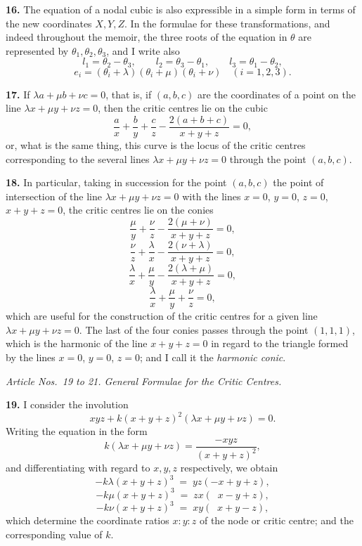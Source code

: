 \documentclass[11pt,a4paper]{article}
\begin{document}
\medskip

\textbf{16.} The equation of a nodal cubic is also expressible in a simple form in terms of the new coordinates $X, Y, Z$. In the formulae for these transformations, and indeed throughout the memoir, the three roots of the equation in $\theta$ are represented by $\theta_1, \theta_2, \theta_3$, and I write also
\[
l_1 = \theta_2 - \theta_3,\qquad l_2 = \theta_3 - \theta_1,\qquad l_3 = \theta_1 - \theta_2,
\]
\[
e_i = (\theta_i + \lambda)(\theta_i + \mu)(\theta_i + \nu)\quad (i = 1, 2, 3).
\]

\medskip

\textbf{17.} If $\lambda a + \mu b + \nu c = 0$, that is, if $(a, b, c)$ are the coordinates of a point on the line $\lambda x + \mu y + \nu z = 0$, then the critic centres lie on the cubic
\[
\frac{a}{x} + \frac{b}{y} + \frac{c}{z} - \frac{2(a + b + c)}{x + y + z} = 0,
\]
or, what is the same thing, this curve is the locus of the critic centres corresponding to the several lines $\lambda x + \mu y + \nu z = 0$ through the point $(a, b, c)$.

\medskip

\textbf{18.} In particular, taking in succession for the point $(a, b, c)$ the point of intersection of the line $\lambda x + \mu y + \nu z = 0$ with the lines $x = 0$, $y = 0$, $z = 0$, $x + y + z = 0$, the critic centres lie on the conies
\[
\frac{\mu}{y} + \frac{\nu}{z} - \frac{2(\mu + \nu)}{x + y + z} = 0,
\]
\[
\frac{\nu}{z} + \frac{\lambda}{x} - \frac{2(\nu + \lambda)}{x + y + z} = 0,
\]
\[
\frac{\lambda}{x} + \frac{\mu}{y} - \frac{2(\lambda + \mu)}{x + y + z} = 0,
\]
\[
\frac{\lambda}{x} + \frac{\mu}{y} + \frac{\nu}{z} = 0,
\]
which are useful for the construction of the critic centres for a given line $\lambda x + \mu y + \nu z = 0$. The last of the four conies passes through the point $(1, 1, 1)$, which is the harmonic of the line $x + y + z = 0$ in regard to the triangle formed by the lines $x = 0$, $y = 0$, $z = 0$; and I call it the \emph{harmonic conic}.

\begin{center}
\textit{Article Nos.~19 to 21. General Formulae for the Critic Centres.}
\end{center}

\textbf{19.} I consider the involution
\[
xyz + k(x + y + z)^2(\lambda x + \mu y + \nu z) = 0.
\]
Writing the equation in the form
\[
k(\lambda x + \mu y + \nu z) = \frac{-xyz}{(x + y + z)^2},
\]
and differentiating with regard to $x, y, z$ respectively, we obtain
\[
-k\lambda(x + y + z)^3 \;=\; yz(-x + y + z),
\]
\[
-k\mu(x + y + z)^3 \;=\; zx(\;\;x - y + z),
\]
\[
-k\nu(x + y + z)^3 \;=\; xy(\;\;x + y - z),
\]
which determine the coordinate ratios $x : y : z$ of the node or critic centre; and the corresponding value of $k$.
\end{document}
